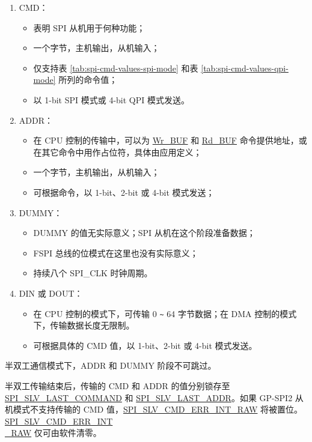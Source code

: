 \documentclass[main\_\_CN.tex]{subfiles}
\begin{document}
\begin{enumerate}
   \item CMD：
        \begin{itemize}
            \item 表明 SPI 从机用于何种功能；
            \item 一个字节，主机输出，从机输入；
            \item 仅支持表 \ref{tab:spi-cmd-values-spi-mode} 和表 \ref{tab:spi-cmd-values-qpi-mode} 所列的命令值；
            \item 以 1-bit SPI 模式或 4-bit QPI 模式发送。
        \end{itemize}

   \item ADDR：
        \begin{itemize}
            \item 在 CPU 控制的传输中，可以为  \hyperlink{other:spi-item-wrbuf}{Wr\_BUF} 和  \hyperlink{other:spi-item-rdbuf}{Rd\_BUF} 命令提供地址，或在其它命令中用作占位符，具体由应用定义；
            \item 一个字节，主机输出，从机输入；
            \item 可根据命令，以 1-bit、2-bit 或 4-bit 模式发送；
        \end{itemize}

   \item DUMMY：
        \begin{itemize}
            \item DUMMY 的值无实际意义；SPI 从机在这个阶段准备数据；
            \item FSPI 总线的位模式在这里也没有实际意义；
            \item 持续八个 SPI\_CLK 时钟周期。
        \end{itemize}

   \item DIN 或 DOUT：

        \begin{itemize}
            \item 在 CPU 控制的模式下，可传输 0 \verb+~+ 64 字节数据；在 DMA 控制的模式下，传输数据长度无限制。
            \item 可根据具体的 CMD 值，以 1-bit、2-bit 或 4-bit 模式发送。
        \end{itemize}

   \end{enumerate}

\begin{tiplisting}
半双工通信模式下，ADDR 和 DUMMY 阶段不可跳过。
\end{tiplisting}
\vspace{-1em}
半双工传输结束后，传输的 CMD 和 ADDR 的值分别锁存至 \hyperref[fielddesc:SPISLVLASTCOMMAND]{SPI\_SLV\_LAST\_COMMAND} 和 \hyperref[fielddesc:SPISLVLASTADDR]{SPI\_SLV\_LAST\_ADDR}。如果 GP-SPI2 从机模式不支持传输的 CMD 值，\hyperref[fielddesc:SPISLVCMDERRINTRAW]{SPI\_SLV\_CMD\_ERR\_INT\_RAW} 将被置位。 \hyperref[fielddesc:SPISLVCMDERRINTRAW]{SPI\_SLV\_CMD\_ERR\_INT\\\_RAW} 仅可由软件清零。
\end{document}
